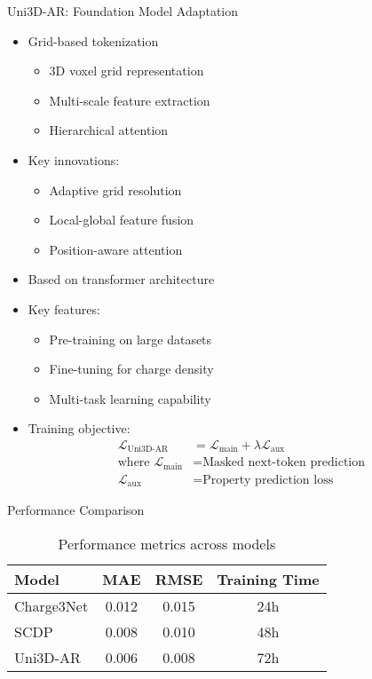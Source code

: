 \documentclass[aspectratio=169]{beamer}
\begin{document}
\begin{frame}{Uni3D-AR: Foundation Model Adaptation}
    \begin{itemize}
        \item Grid-based tokenization
        \begin{itemize}
            \item 3D voxel grid representation
            \item Multi-scale feature extraction
            \item Hierarchical attention
        \end{itemize}
        \item Key innovations:
        \begin{itemize}
            \item Adaptive grid resolution
            \item Local-global feature fusion
            \item Position-aware attention
        \end{itemize}
        \item Based on transformer architecture
        \item Key features:
        \begin{itemize}
            \item Pre-training on large datasets
            \item Fine-tuning for charge density
            \item Multi-task learning capability
        \end{itemize}
        \item Training objective:
        \begin{align*}
            \mathcal{L}_{\text{Uni3D-AR}} &= \mathcal{L}_{\text{main}} + \lambda\mathcal{L}_{\text{aux}} \\
            \text{where } \mathcal{L}_{\text{main}} &= \text{Masked next-token prediction} \\
            \mathcal{L}_{\text{aux}} &= \text{Property prediction loss}
        \end{align*}
    \end{itemize}
\end{frame}


\begin{frame}{Performance Comparison}
    \begin{table}[h]
        \centering
        \begin{tabular}{lccc}
            \toprule
            Model & MAE & RMSE & Training Time \\
            \midrule
            Charge3Net & 0.012 & 0.015 & 24h \\
            SCDP & 0.008 & 0.010 & 48h \\
            Uni3D-AR & 0.006 & 0.008 & 72h \\
            \bottomrule
        \end{tabular}
        \caption{Performance metrics across models}
    \end{table}
\end{frame}
\end{document}
